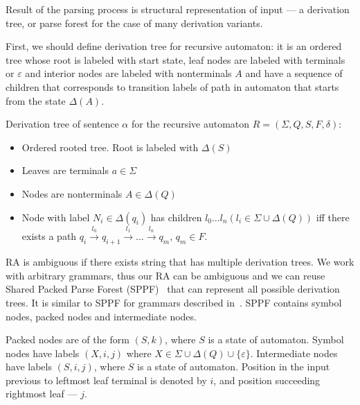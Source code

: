 \documentclass[runningheads,a4paper]{llncs}
\begin{document}
Result of the parsing process is structural representation of input --- a derivation tree, or parse forest for the case of many derivation variants.

First, we should define derivation tree for recursive automaton: it is an ordered tree whose root is labeled with start state,
leaf nodes are labeled with terminals or $\varepsilon$ and interior nodes are labeled with 
nonterminals $A$ and have a sequence of children that corresponds to transition labels of path in 
automaton that starts from the state $\Delta(A)$.

\begin{mydef}

Derivation tree of sentence $\alpha$ for the recursive automaton $R=(\Sigma, Q, S, F, \delta)$:%

\begin{itemize}
\item Ordered rooted tree. Root is labeled with $\Delta(S)$
\item Leaves are terminals $a\in \Sigma$
\item Nodes are nonterminals $A\in \Delta(Q)$
\item Node with label $N_i \in \Delta(q_i)$ has children $l_0 \dots l_n (l_i \in \Sigma \cup \Delta(Q))$ iff there exists a
path
$q_i \xrightarrow[]{l_0} q_{i+1} \xrightarrow[]{l_1} \dots \xrightarrow{l_n} q_m$, $q_m \in F$. 
\end{itemize}

\end{mydef}

RA is ambiguous if there exists string that has multiple derivation trees. 
We work with arbitrary grammars, thus our RA can be ambiguous and we can reuse Shared Packed Parse Forest (SPPF)~\cite{SPPF} that can represent all possible derivation trees.
It is similar to SPPF for grammars described in~\cite{scott2013gll}.
SPPF contains symbol nodes, packed nodes and intermediate nodes. 

Packed nodes are of the form $(S, k)$, where $S$ is a state of automaton. 
Symbol nodes have labels $(X, i, j)$ where $X \in \Sigma \cup \Delta(Q) \cup \{\varepsilon\}$. 
Intermediate nodes have labels $ (S, i, j) $, where $S$ is a state of automaton.
Position in the input previous to leftmost leaf terminal is denoted by $i$, and position succeeding rightmost leaf --- $j$.
\end{document}
